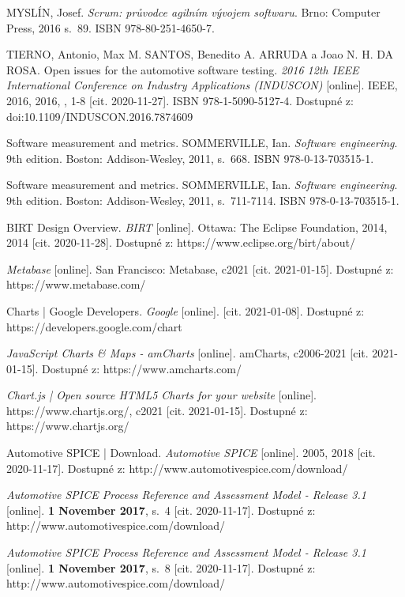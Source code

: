 \documentclass[czech,master,public,dept460,male,cpdeclaration,oneside]{diploma}
\begin{document}
\begin{thebibliography}{43}
MYSLÍN, Josef. \textit{Scrum: průvodce agilním vývojem softwaru}. Brno: Computer Press, 2016 s.~89. ISBN 978-80-251-4650-7.

TIERNO, Antonio, Max M. SANTOS, Benedito A. ARRUDA a Joao N. H. DA ROSA. Open issues for the automotive software testing. \textit{2016 12th IEEE International Conference on Industry Applications (INDUSCON)} [online]. IEEE, 2016, 2016, , 1-8 [cit. 2020-11-27]. ISBN 978-1-5090-5127-4. Dostupné z: doi:10.1109/INDUSCON.2016.7874609

Software measurement and metrics. SOMMERVILLE, Ian. \textit{Software engineering}. 9th edition. Boston: Addison-Wesley, 2011, s.~668. ISBN 978-0-13-703515-1.


Software measurement and metrics. SOMMERVILLE, Ian. \textit{Software engineering}. 9th edition. Boston: Addison-Wesley, 2011, s.~711-7114. ISBN 978-0-13-703515-1.

BIRT Design Overview. \textit{BIRT} [online]. Ottawa: The Eclipse Foundation, 2014, 2014 [cit. 2020-11-28]. Dostupné z: https://www.eclipse.org/birt/about/

\textit{Metabase} [online]. San Francisco: Metabase, c2021 [cit. 2021-01-15]. Dostupné z: https://www.metabase.com/

Charts | Google Developers. \textit{Google} [online]. [cit. 2021-01-08]. Dostupné z: https://developers.google.com/chart

\textit{JavaScript Charts \& Maps - amCharts} [online]. amCharts, c2006-2021 [cit. 2021-01-15]. Dostupné z: https://www.amcharts.com/

\textit{Chart.js | Open source HTML5 Charts for your website} [online]. https://www.chartjs.org/, c2021 [cit. 2021-01-15]. Dostupné z: https://www.chartjs.org/

Automotive SPICE | Download. \textit{Automotive SPICE} [online]. 2005, 2018 [cit. 2020-11-17]. Dostupné z: http://www.automotivespice.com/download/

\textit{Automotive SPICE Process Reference and Assessment Model - Release 3.1} [online]. \textbf{1 November 2017}, s.~4 [cit. 2020-11-17]. Dostupné z: http://www.automotivespice.com/download/

\textit{Automotive SPICE Process Reference and Assessment Model - Release 3.1} [online]. \textbf{1 November 2017}, s.~8 [cit. 2020-11-17]. Dostupné z: http://www.automotivespice.com/download/


\end{thebibliography}
\end{document}
